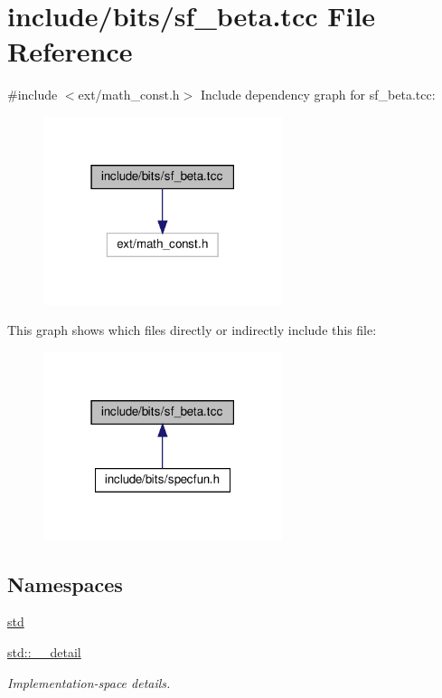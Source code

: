 \hypertarget{sf__beta_8tcc}{}\section{include/bits/sf\+\_\+beta.tcc File Reference}
\label{sf__beta_8tcc}
{\ttfamily \#include $<$ext/math\+\_\+const.\+h$>$}\newline
Include dependency graph for sf\+\_\+beta.\+tcc\+:
\nopagebreak
\begin{figure}[H]
\begin{center}
\leavevmode
\includegraphics[width=198pt]{sf__beta_8tcc__incl}
\end{center}
\end{figure}
This graph shows which files directly or indirectly include this file\+:
\nopagebreak
\begin{figure}[H]
\begin{center}
\leavevmode
\includegraphics[width=198pt]{sf__beta_8tcc__dep__incl}
\end{center}
\end{figure}
\subsection*{Namespaces}
\begin{DoxyCompactItemize}
\item 
 \hyperlink{namespacestd}{std}
\item 
 \hyperlink{namespacestd_1_1____detail}{std\+::\+\_\+\+\_\+detail}
\begin{DoxyCompactList}\small\item\em Implementation-\/space details. \end{DoxyCompactList}\end{DoxyCompactItemize}
